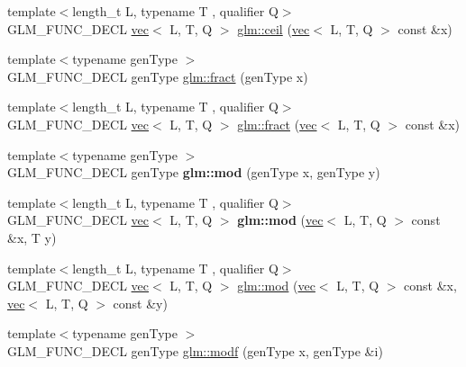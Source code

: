 \begin{DoxyCompactItemize}
\item 
{\footnotesize template$<$length\+\_\+t L, typename T , qualifier Q$>$ }\\G\+L\+M\+\_\+\+F\+U\+N\+C\+\_\+\+D\+E\+CL \hyperlink{structglm_1_1vec}{vec}$<$ L, T, Q $>$ \hyperlink{group__core__func__common_gafb9d2a645a23aca12d4d6de0104b7657}{glm\+::ceil} (\hyperlink{structglm_1_1vec}{vec}$<$ L, T, Q $>$ const \&x)
\item 
{\footnotesize template$<$typename gen\+Type $>$ }\\G\+L\+M\+\_\+\+F\+U\+N\+C\+\_\+\+D\+E\+CL gen\+Type \hyperlink{group__core__func__common_ga8ba89e40e55ae5cdf228548f9b7639c7}{glm\+::fract} (gen\+Type x)
\item 
{\footnotesize template$<$length\+\_\+t L, typename T , qualifier Q$>$ }\\G\+L\+M\+\_\+\+F\+U\+N\+C\+\_\+\+D\+E\+CL \hyperlink{structglm_1_1vec}{vec}$<$ L, T, Q $>$ \hyperlink{group__core__func__common_ga2df623004f634b440d61e018d62c751b}{glm\+::fract} (\hyperlink{structglm_1_1vec}{vec}$<$ L, T, Q $>$ const \&x)
\item 
\mbox{\label{group__core__func__common_ga12201563ef902e3b07e0d1d7656efdb1}} 
{\footnotesize template$<$typename gen\+Type $>$ }\\G\+L\+M\+\_\+\+F\+U\+N\+C\+\_\+\+D\+E\+CL gen\+Type {\bfseries glm\+::mod} (gen\+Type x, gen\+Type y)
\item 
\mbox{\label{group__core__func__common_gafddfd397d57f94556b9560594172a439}} 
{\footnotesize template$<$length\+\_\+t L, typename T , qualifier Q$>$ }\\G\+L\+M\+\_\+\+F\+U\+N\+C\+\_\+\+D\+E\+CL \hyperlink{structglm_1_1vec}{vec}$<$ L, T, Q $>$ {\bfseries glm\+::mod} (\hyperlink{structglm_1_1vec}{vec}$<$ L, T, Q $>$ const \&x, T y)
\item 
{\footnotesize template$<$length\+\_\+t L, typename T , qualifier Q$>$ }\\G\+L\+M\+\_\+\+F\+U\+N\+C\+\_\+\+D\+E\+CL \hyperlink{structglm_1_1vec}{vec}$<$ L, T, Q $>$ \hyperlink{group__core__func__common_ga9b197a452cd52db3c5c18bac72bd7798}{glm\+::mod} (\hyperlink{structglm_1_1vec}{vec}$<$ L, T, Q $>$ const \&x, \hyperlink{structglm_1_1vec}{vec}$<$ L, T, Q $>$ const \&y)
\item 
{\footnotesize template$<$typename gen\+Type $>$ }\\G\+L\+M\+\_\+\+F\+U\+N\+C\+\_\+\+D\+E\+CL gen\+Type \hyperlink{group__core__func__common_ga85e33f139b8db1b39b590a5713b9e679}{glm\+::modf} (gen\+Type x, gen\+Type \&i)

\end{DoxyCompactItemize}
